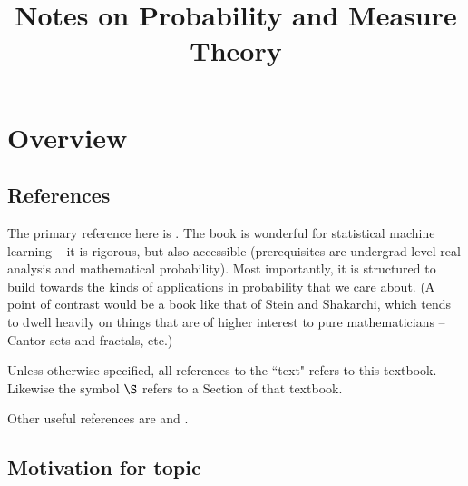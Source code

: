 \documentclass{article} %
\begin{document}
\newcommand{\epsilontilde}{\widetilde{\epsilon}}

\newcommand{\convergenceAE}{\stackrel{a.e.}{\to}}
\newcommand{\convergenceAU}{\stackrel{AU}{\to}}
\newcommand{\convergenceInMu}{\stackrel{\mu}{\to}}
\newcommand{\convergenceInLp}{\stackrel{L^p}{\to}}
\newcommand{\convergenceInLinfty}{\stackrel{L^\infty}{\to}}

\newcommand{\notConvergenceAE}{\stackrel{a.e.}{\not\to}}
\newcommand{\notConvergenceAU}{\stackrel{AU}{\not\to}}
\newcommand{\notConvergenceInMu}{\stackrel{\mu}{\not\to}}
\newcommand{\notConvergenceInLp}{\stackrel{L^p}{\not\to}}
\newcommand{\notConvergenceInLinfty}{\stackrel{L^\infty}{\not\to}}

\title{Notes on Probability and Measure Theory} 
\maketitle
\setcounter{tocdepth}{2}
\tableofcontents
\newpage 

\section{Overview}

\subsection{References}
The primary reference here is \cite{ash2000probability}.   The book is wonderful for statistical machine learning – it is rigorous,  but also accessible (prerequisites are undergrad-level real analysis and mathematical probability).  Most importantly, it is structured to build towards the kinds of applications in probability that we care about.   (A point of contrast would be a book like that of Stein and Shakarchi, which tends to dwell heavily on things that are of higher interest to pure mathematicians – Cantor sets and fractals, etc.) 

 Unless otherwise specified, all references to the ``text" refers to this textbook.  Likewise the symbol $\S$ refers to a Section of that textbook.
 
 Other useful references are \cite{folland1999real} and \cite{rudin1987real}. 
 
\subsection{Motivation for topic} \label{sec:motivation_for_topic}
\end{document}
